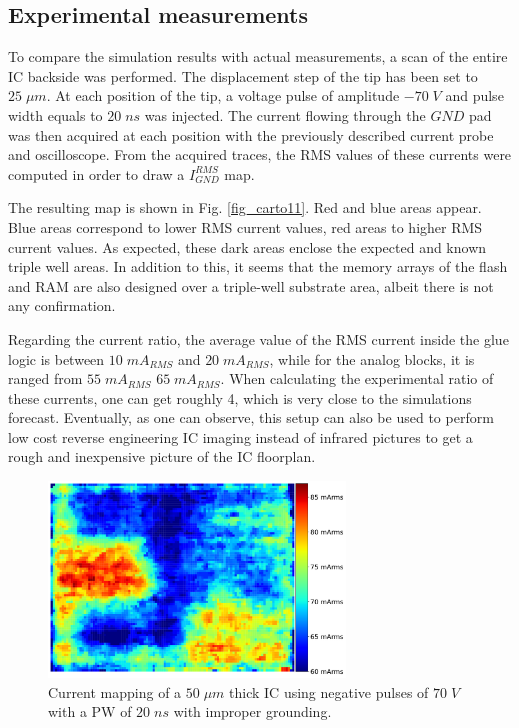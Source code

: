 \documentclass[10pt, conference, compsocconf]{IEEEtran}
\begin{document}
\subsection{Experimental measurements}
To compare the simulation results with actual measurements, a scan of the entire IC backside was performed. The displacement step of the tip has been set to $25 \; \mu m$. At each position of the tip, a voltage pulse of amplitude $-70 \; V$ and pulse width equals to $20 \; ns$ was injected. The current flowing through the $GND$ pad was then acquired at each position with the previously described current probe and oscilloscope. From the acquired traces, the RMS values of these currents were computed in order to draw a $I_{GND}^{RMS}$ map.

The resulting map is shown in Fig. \ref{fig_carto11}. Red and blue areas appear. Blue areas correspond to lower RMS current values, red areas to higher RMS current values. As expected, these dark areas enclose the expected and known triple well areas. In addition to this, it seems that the memory arrays of the flash and RAM are also designed over a triple-well substrate area, albeit there is not any confirmation.

Regarding the current ratio, the average value of the RMS current inside the glue logic is between $10\;mA_{RMS}$ and $20\;mA_{RMS}$, while for the analog blocks, it is ranged from $55\;mA_{RMS}$ $65\;mA_{RMS}$. When calculating the experimental ratio of these currents, one can get roughly 4, which is very close to the simulations forecast.
Eventually, as one can observe, this setup can also be used to perform low cost reverse engineering IC imaging instead of infrared pictures to get a rough and inexpensive picture of the IC floorplan.

\begin{figure}[!ht]
\centering
\includegraphics[width=3.1in]{A4_carto3_.pdf}
\caption{Current mapping of a $50 \; \mu m$ thick IC using negative pulses of $70 \; V$ with a PW of $20 \; ns$ with improper grounding.}
\label{carto3}
\end{figure}
\end{document}
